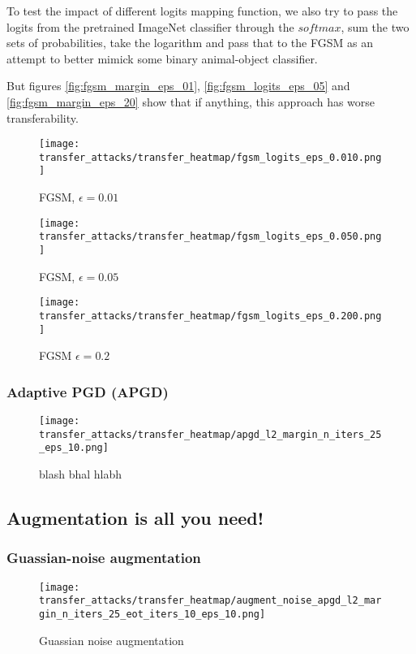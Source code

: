 To test the impact of different logits mapping function, we also try to pass the logits from the pretrained ImageNet classifier through the $softmax$, sum the two sets of probabilities, take the logarithm and pass that to the FGSM as an attempt to better mimick some binary animal-object classifier.


But figures \ref{fig:fgsm_margin_eps_01}, \ref{fig:fgsm_logits_eps_05} and \ref{fig:fgsm_margin_eps_20} show that if anything, this approach has worse transferability.

\begin{figure}[!htb]
  \texttt{[image: transfer\_attacks/transfer\_heatmap/fgsm\_logits\_eps\_0.010.png]}
  \caption{FGSM, $\epsilon = 0.01$}\label{fig:fgsm_logits_eps_01}
\endminipage\hfill
{}
  \texttt{[image: transfer\_attacks/transfer\_heatmap/fgsm\_logits\_eps\_0.050.png]}
  \caption{FGSM, $\epsilon = 0.05$}\label{fig:fgsm_logits_eps_05}
\endminipage\hfill
{}%
  \texttt{[image: transfer\_attacks/transfer\_heatmap/fgsm\_logits\_eps\_0.200.png]}
  \caption{FGSM $\epsilon = 0.2$}\label{label:fgsm_logits_eps_20}
\endminipage
\end{figure}





\subsubsection{Adaptive PGD (APGD)}
\begin{figure}[h]
    \centering
    \texttt{[image: transfer\_attacks/transfer\_heatmap/apgd\_l2\_margin\_n\_iters\_25\_eps\_10.png]}
    \caption{blash bhal hlabh}
    \label{fig:apgd_margin}
\end{figure}

\subsection{Augmentation is all you need!}
\subsubsection{Guassian-noise augmentation}
\begin{figure}[h]
    \centering
    \texttt{[image: transfer\_attacks/transfer\_heatmap/augment\_noise\_apgd\_l2\_margin\_n\_iters\_25\_eot\_iters\_10\_eps\_10.png]}
    \caption{Guassian noise augmentation}
    \label{fig:noise_augment}
\end{figure}




